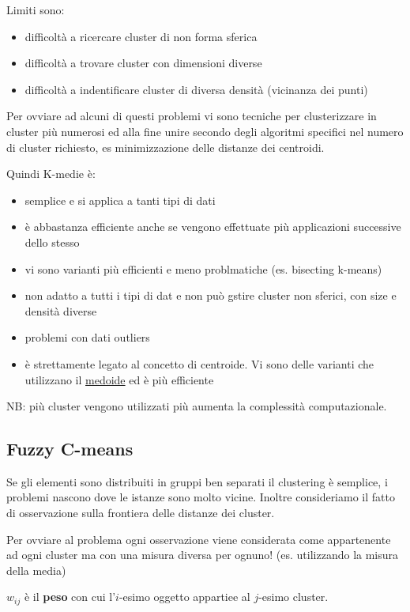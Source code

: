 Limiti sono:
\begin{itemize}
	\item difficolt\`a a ricercare cluster di non forma sferica
	\item difficolt\`a a trovare cluster con dimensioni diverse
	\item difficolt\`a a indentificare cluster di diversa densit\`a (vicinanza dei punti)
\end{itemize}

Per ovviare ad alcuni di questi problemi vi sono tecniche per clusterizzare in cluster pi\`u numerosi ed alla fine unire secondo degli algoritmi specifici nel numero di cluster richiesto, es minimizzazione delle distanze dei centroidi. 

Quindi K-medie \`e:
\begin{itemize}
	\item semplice e si applica a tanti tipi di dati
	\item \`e abbastanza efficiente anche se vengono effettuate pi\`u applicazioni successive dello stesso
	\item vi sono varianti pi\`u efficienti e meno problmatiche (es. bisecting k-means)
	\item non adatto a tutti i tipi di dat e non pu\`o gstire cluster non sferici, con size e densit\`a diverse
	\item problemi con dati outliers
	\item \`e strettamente legato al concetto di centroide. Vi sono delle varianti che utilizzano il \underline{medoide} ed \`e pi\`u efficiente
	
	
\end{itemize}
NB: pi\`u cluster vengono utilizzati pi\`u aumenta la complessit\`a computazionale.


\subsection{Fuzzy C-means}
Se gli elementi sono distribuiti in gruppi ben separati il clustering \`e semplice, i problemi nascono dove le istanze sono molto vicine. Inoltre consideriamo il fatto di osservazione sulla frontiera delle distanze dei cluster. 

Per ovviare al problema ogni osservazione viene considerata come appartenente ad ogni cluster ma con una misura diversa per ognuno! (es. utilizzando la misura della media)

$w_{ij}$ \`e il \textbf{peso} con cui l'$i$-esimo oggetto appartiee al $j$-esimo cluster.

